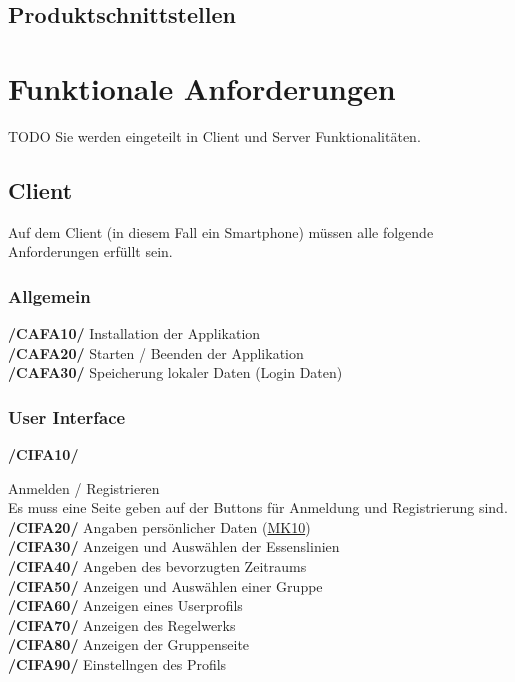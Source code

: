 \documentclass[a4paper]{scrreprt}
\begin{document}
\section{Produktschnittstellen} 
 
\chapter{Funktionale Anforderungen}
TODO Sie werden eingeteilt in Client und Server Funktionalitäten.

\section{Client}
Auf dem Client (in diesem Fall ein Smartphone) müssen alle folgende Anforderungen erfüllt sein. 

\subsection{Allgemein}

\begin{addmargin}[25pt]{0pt} 
\textbf{/CAFA10/} Installation der Applikation \\
\textbf{/CAFA20/} Starten / Beenden der Applikation\\
\textbf{/CAFA30/} Speicherung lokaler Daten (Login Daten)\\
\end{addmargin}

\subsection{User Interface}

\begin{addmargin}[25pt]{0pt} 
\hypertarget{cifa10}{\textbf{/CIFA10/}} Anmelden / Registrieren \\
Es muss eine Seite geben auf der Buttons für Anmeldung und Registrierung sind.
\hypertarget{cifa20}{\textbf{/CIFA20/}} Angaben persönlicher Daten (\hyperlink{mk10}{MK10})\\
\hypertarget{cifa30}{\textbf{/CIFA30/}} Anzeigen und Auswählen der Essenslinien\\
\hypertarget{cifa40}{\textbf{/CIFA40/}} Angeben des bevorzugten Zeitraums\\
\hypertarget{cifa50}{\textbf{/CIFA50/}} Anzeigen und Auswählen einer Gruppe\\
\hypertarget{cifa60}{\textbf{/CIFA60/}} Anzeigen eines Userprofils\\
\hypertarget{cifa70}{\textbf{/CIFA70/}} Anzeigen des Regelwerks\\
\hypertarget{cifa80}{\textbf{/CIFA80/}} Anzeigen der Gruppenseite\\
\hypertarget{cifa90}{\textbf{/CIFA90/}} Einstellngen des Profils\\
\end{addmargin}
\end{document}
